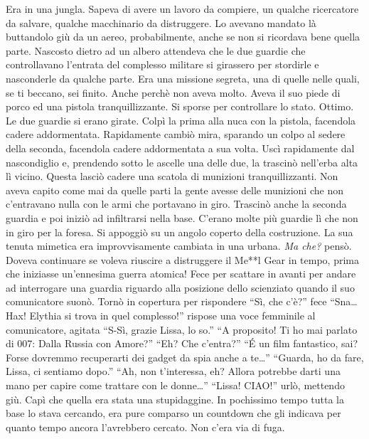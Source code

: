     Era in una jungla. Sapeva di avere un lavoro da compiere, un qualche
    ricercatore da salvare, qualche macchinario da distruggere. Lo avevano mandato là buttandolo giù da un
    aereo, probabilmente, anche se non si ricordava bene quella parte.
    Nascosto dietro ad un albero attendeva che le due guardie che
    controllavano l'entrata del complesso militare si girassero per
    stordirle e nasconderle da qualche parte. Era una missione segreta, una
    di quelle nelle quali, se ti beccano, sei finito. Anche perchè non
    aveva molto. Aveva il suo piede di porco ed una pistola
    tranquillizzante. Si sporse per controllare lo stato. Ottimo. Le due
    guardie si erano girate. Colpì la prima alla nuca con la pistola,
    facendola cadere addormentata. Rapidamente cambiò mira, sparando un
    colpo al sedere della seconda, facendola cadere addormentata a sua
    volta. Uscì rapidamente dal nascondiglio e, prendendo sotto le ascelle
    una delle due, la trascinò nell'erba alta lì vicino. Questa lasciò
    cadere una scatola di munizioni tranquillizzanti. Non aveva capito come
    mai da quelle parti la gente avesse delle munizioni che non c'entravano
    nulla con le armi che portavano in giro. Trascinò anche la seconda
    guardia e poi iniziò ad infiltrarsi nella base. C'erano molte più
    guardie lì che non in giro per la foresa. Si appoggiò su un angolo
    coperto della costruzione. La sua tenuta mimetica era improvvisamente
    cambiata in una urbana. \emph{Ma che?} pensò. Doveva continuare se
    voleva riuscire a distruggere il Me**l Gear in tempo, prima che
    iniziasse un'ennesima guerra atomica! Fece per scattare in avanti per
    andare ad interrogare una guardia riguardo alla posizione dello
    scienziato quando il suo comunicatore suonò. Tornò in copertura per
    rispondere ``Sì, che c'è?'' fece  ``Sna\dots{}Hax! Elythia si trova in
    quel complesso!'' rispose una voce femminile al comunicatore, agitata
    ``S-Sì, grazie Lissa, lo so.'' ``A proposito! Ti ho mai parlato di
    007: Dalla Russia con Amore?'' ``Eh? Che c'entra?'' ``\'E un film
    fantastico, sai? Forse dovremmo recuperarti dei gadget da spia anche a
    te\dots{}'' ``Guarda, ho da fare, Lissa, ci sentiamo dopo.'' ``Ah, non
    t'interessa, eh? Allora potrebbe darti una mano per capire come
    trattare con le donne\dots{}'' ``Lissa! CIAO!'' urlò, mettendo giù.
    Capì che quella era stata una stupidaggine. In pochissimo tempo tutta
    la base lo stava cercando, era pure comparso un countdown che gli
    indicava per quanto tempo ancora l'avrebbero cercato. Non c'era via di
    fuga.

